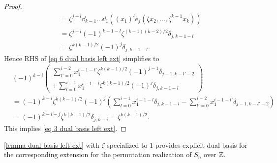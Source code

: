 \begin{proof}
\begin{align*}
     &= \zeta^{j+l} \dd_{k-1} \ldots \dd_1(( x_1)^le_j(\zeta x_2, \ldots, \zeta^{k-1} x_{k}))\\
     &=\zeta^{j+l}(-1)^{k-1-l}\zeta^{(k-1)(k-2)/2}\delta_{j, k-1-l}\\
     &=\zeta^{k(k-1)/2}(-1)^{j}\delta_{j,k-1-l}.
    \end{align*}
Hence RHS of \eqref{eq 6 dual basis left ext} simplifies to
\begin{align*}
    &(-1)^{k-i}\left(
    \begin{array}{c}
    \displaystyle \sum_{l'=0}^{i-2} x_1^{i-1-l'}\zeta^{k(k-1)/2}(-1)^{j-1}\delta_{j-1,k-l'-2}    \\
    + \displaystyle \sum_{l=0}^{i-1}x_1^{i-1-l}\zeta^{k(k-1)/2}(-1)^{j}\delta_{j,k-1-l}
     \end{array}   \right)\\
    &=(-1)^{k-i}\zeta^{k(k-1)/2}(-1)^{j} \left(
    \displaystyle \sum_{l=0}^{i-1}x_1^{i-1-l}\delta_{j,k-1-l}
    -\displaystyle \sum_{l'=0}^{i-2} x_1^{i-1-l'}\delta_{j-1,k-l'-2}
    \right)\\
    &=(-1)^{k-i-j}\zeta^{k(k-1)/2}\delta_{j,k-i}=\zeta^{k(k-1)/2}.
\end{align*}
This implies \eqref{eq 3 dual basis left ext}.
\end{proof}

\begin{remark}\label{rmk explicit dual basis permutation realization}
    \cref{lemma dual basis left ext} with $\zeta$ specialized to $1$ provides explicit dual basis for the corresponding extension for the permutation realization of $S_n$ over $\mathbb{Z}$. 
\end{remark}


